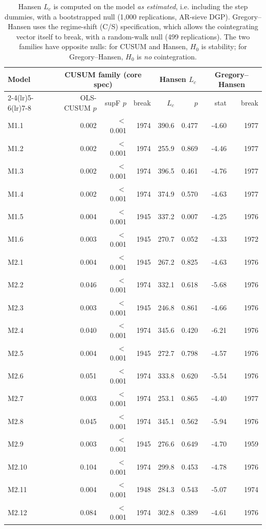 \documentclass[11pt,a4paper]{article}
\begin{document}
\begin{table}[H]\centering\caption{Parameter stability: CUSUM family, Hansen (1992), Gregory--Hansen}
\small\begin{tabular}{lrrrrrrr}
\toprule
\multirow{2}{*}{Model} & \multicolumn{3}{c}{CUSUM family (core spec)} & \multicolumn{2}{c}{Hansen $L_c$} & \multicolumn{2}{c}{Gregory--Hansen} \\
\cmidrule(lr){2-4}\cmidrule(lr){5-6}\cmidrule(lr){7-8}
 & OLS-CUSUM $p$ & supF $p$ & break & $L_c$ & $p$ & stat & break \\
\midrule
M1.1 & 0.002 & $<$0.001 & 1974 & 390.6 & 0.477 & -4.60 & 1977 \\
M1.2 & 0.002 & $<$0.001 & 1974 & 255.9 & 0.869 & -4.46 & 1977 \\
M1.3 & 0.002 & $<$0.001 & 1974 & 396.5 & 0.461 & -4.76 & 1977 \\
M1.4 & 0.002 & $<$0.001 & 1974 & 374.9 & 0.570 & -4.63 & 1977 \\
M1.5 & 0.004 & $<$0.001 & 1945 & 337.2 & 0.007 & -4.25 & 1976 \\
M1.6 & 0.003 & $<$0.001 & 1945 & 270.7 & 0.052 & -4.33 & 1972 \\
M2.1 & 0.004 & $<$0.001 & 1945 & 267.2 & 0.825 & -4.63 & 1976 \\
M2.2 & 0.046 & $<$0.001 & 1974 & 332.1 & 0.618 & -5.68 & 1976 \\
M2.3 & 0.003 & $<$0.001 & 1945 & 246.8 & 0.861 & -4.66 & 1976 \\
M2.4 & 0.040 & $<$0.001 & 1974 & 345.6 & 0.420 & -6.21 & 1976 \\
M2.5 & 0.004 & $<$0.001 & 1945 & 272.7 & 0.798 & -4.57 & 1976 \\
M2.6 & 0.051 & $<$0.001 & 1974 & 333.8 & 0.620 & -5.54 & 1976 \\
M2.7 & 0.003 & $<$0.001 & 1974 & 253.1 & 0.865 & -4.40 & 1977 \\
M2.8 & 0.045 & $<$0.001 & 1974 & 345.1 & 0.562 & -5.94 & 1976 \\
M2.9 & 0.003 & $<$0.001 & 1945 & 276.6 & 0.649 & -4.70 & 1959 \\
M2.10 & 0.104 & $<$0.001 & 1974 & 299.8 & 0.453 & -4.78 & 1976 \\
M2.11 & 0.004 & $<$0.001 & 1948 & 284.3 & 0.543 & -5.07 & 1974 \\
M2.12 & 0.084 & $<$0.001 & 1974 & 302.8 & 0.389 & -4.61 & 1976 \\
\bottomrule
\end{tabular}
\caption*{\footnotesize Hansen $L_c$ is computed on the model \emph{as estimated}, i.e. including  the step dummies, with a bootstrapped null (1{,}000 replications, AR-sieve DGP).  Gregory--Hansen uses the regime-shift (C/S) specification, which allows the cointegrating vector  itself to break, with a random-walk null (499 replications).  The two families have opposite nulls: for CUSUM and Hansen, $H_0$ is stability; for  Gregory--Hansen, $H_0$ is \emph{no} cointegration.}
\end{table}
\end{document}
